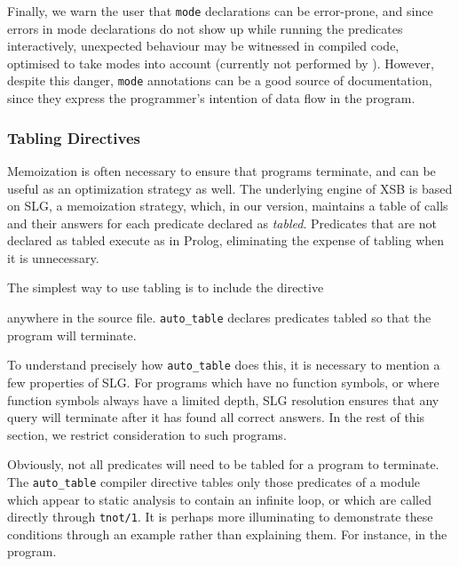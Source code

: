 Finally, we warn the user that {\tt mode} declarations can be error-prone,
and since errors in mode declarations do not show up while running the
predicates interactively, unexpected behaviour may be witnessed in compiled
code, optimised to take modes into account (currently not performed by
\ourprolog).  However, despite this danger, {\tt mode} annotations can be
a good source of documentation, since they express the programmer's
intention of data flow in the program.


\subsubsection{Tabling Directives}\label{tabling_directives}
Memoization is often necessary to ensure that programs terminate, and
can be useful as an optimization strategy as well.  The underlying
engine of XSB is based on SLG, a memoization strategy, which,
in our version, maintains a table of calls and their answers for each
predicate declared as {\em tabled}.  Predicates that are not declared
as tabled execute as in Prolog, eliminating the expense of tabling
when it is unnecessary.

The simplest way to use tabling is to include the directive


\noindent
anywhere in the source file.  {\tt auto\_table} declares predicates
tabled so that the program will terminate.

To understand precisely how {\tt auto\_table} does this, it is
necessary to mention a few properties of SLG.  For programs which have
no function symbols, or where function symbols always have a limited
depth, SLG resolution ensures that any query will terminate after it
has found all correct answers.  In the rest of this section, we
restrict consideration to such programs.

Obviously, not all predicates will need to be tabled for a program to
terminate.  The {\tt auto\_table} compiler directive tables only those
predicates of a module which appear to static analysis to contain an
infinite loop, or which are called directly through {\tt tnot/1}.  It
is perhaps more illuminating to demonstrate these conditions through
an example rather than explaining them.  For instance, in the program.

